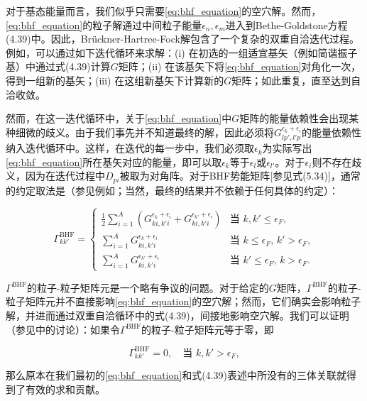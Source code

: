 对于基态能量而言，我们似乎只需要\ref{eq:bhf_equation}的空穴解。然而，\ref{eq:bhf_equation}的粒子解通过中间粒子能量$\epsilon_{n},\epsilon_{m}$进入到Bethe-Goldstone方程(4.39)中。因此，Brückner-Hartree-Fock解包含了一个复杂的双重自洽迭代过程。例如，可以通过如下迭代循环来求解：(i)
在初选的一组适宜基矢（例如简谐振子基）中通过式(4.39)计算$G$矩阵；(ii) 在该基矢下将\ref{eq:bhf_equation}对角化一次，得到一组新的基矢；(iii)
在这组新基矢下计算新的$G$矩阵；如此重复，直至达到自洽收敛。

然而，在这一迭代循环中，关于\ref{eq:bhf_equation}中$G$矩阵的能量依赖性会出现某种细微的歧义。由于我们事先并不知道最终的解，因此必须将$G^{\epsilon_{k}+\epsilon_{i}}_{lp',l'p}$的能量依赖性纳入迭代循环中。这样，在迭代的每一步中，我们必须取$\epsilon_{k}$为实际写出\ref{eq:bhf_equation}所在基矢对应的能量，即可以取$\epsilon_{k}$等于$\epsilon_{l}$或$\epsilon_{l'}$。对于$\epsilon_{i}$则不存在歧义，因为在迭代过程中$D_{pi}$被取为对角阵。对于BHF势能矩阵{[}参见式(5.34){]}，通常的约定取法是（参见例如\cite{Ba69a}；当然，最终的结果并不依赖于任何具体的约定）：

\begin{equation}
\Gamma^{\mathrm{BHF}}_{kk'}=\begin{cases}
\frac{1}{2}\sum^{A}_{i=1}\left(G^{\epsilon_{k}+\epsilon_{i}}_{ki,k'i}+G^{\epsilon_{k'}+\epsilon_{i}}_{ki,k'i}\right) & \text{当 }k,k'\leqslant\epsilon_{F},\\
\sum^{A}_{i=1}G^{\epsilon_{k}+\epsilon_{i}}_{ki,k'i} & \text{当 }k\leqslant\epsilon_{F},\,k'>\epsilon_{F},\\
\sum^{A}_{i=1}G^{\epsilon_{k'}+\epsilon_{i}}_{ki,k'i} & \text{当 }k'\leqslant\epsilon_{F},\,k>\epsilon_{F}.
\end{cases}\label{eq:bhf_gamma}
\end{equation}

$\Gamma^{\mathrm{BHF}}$的粒子-粒子矩阵元是一个略有争议的问题。对于给定的$G$矩阵，$\Gamma^{\mathrm{BHF}}$的粒子-粒子矩阵元并不直接影响\ref{eq:bhf_equation}的空穴解；然而，它们确实会影响粒子解，并进而通过双重自洽循环中的式(4.39)，间接地影响空穴解。我们可以证明（参见\cite{Ba69a,Ne70}中的讨论）：如果令$\Gamma^{\mathrm{BHF}}$的粒子-粒子矩阵元等于零，即

\begin{equation}
\Gamma^{\mathrm{BHF}}_{kk'}=0,\quad\text{当 }k,k'>\epsilon_{F},\label{eq:bhf_gamma_pp}
\end{equation}

那么原本在我们最初的\ref{eq:bhf_equation}和式(4.39)表述中所没有的三体关联就得到了有效的求和贡献。

